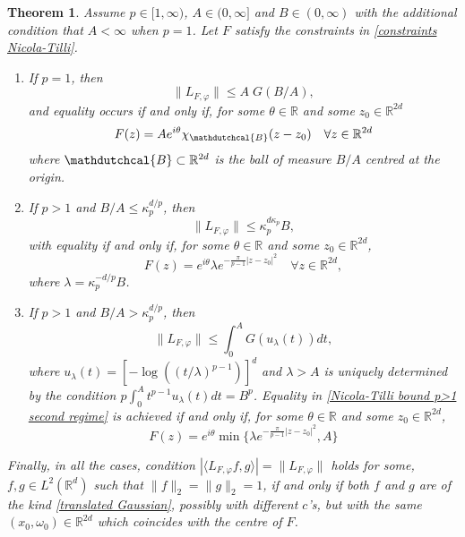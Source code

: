 \documentclass[corpo=11pt, stile=classica, tipotesi=custom,
greek, evenboxes, english]{toptesi}
\numberwithin{equation}{chapter}
\newtheorem{teo}{Theorem}[chapter] %
\theoremstyle{definition}
\theoremstyle{remark}
\newcommand{\R}{\mathbb{R}} %
\begin{document}
\begin{teo}\label{Nicola Tilli norm theorem}
	Assume $p \in [1,\infty)$, $A \in (0, \infty]$ and $B \in (0,\infty)$ with the additional condition that $A < \infty$ when $p=1$. Let $F$ satisfy the constraints in \eqref{constraints Nicola-Tilli}.
	\begin{enumerate}[label=(\roman*)]
		\item If $p=1$, then
		\begin{equation}\label{Nicola-Tilli bound p=1}
			\|L_{F, \varphi}\| \leq A\;G(B/A),
		\end{equation}
		and equality occurs if and only if, for some $\theta \in \R$ and some $z_0 \in \R^{2d}$
		\begin{equation}\label{Nicola-Tilli maximal function p=1}
			F(z) = A e^{i\theta} \chi_{\mathdutchcal{B}} (z-z_0) \quad \forall z \in \R^{2d}
		\end{equation}
		where $\mathdutchcal{B} \subset \R^{2d}$ is the ball of measure $B/A$ centred at the origin.
		
		\item If $p>1$ and $B/A \leq \kappa_p^{d/p}$, then
		\begin{equation}\label{Nicola-Tilli bound p>1 first regime}
			\|L_{F, \varphi}\| \leq \kappa_p^{d \kappa_p}B,
		\end{equation}
		with equality if and only if, for some $\theta \in \R$ and some $z_0 \in \R^{2d}$,
		\begin{equation}\label{Nicola-Tilli maximal function p>1 first regime}
			F(z) = e^{i \theta} \lambda e^{-\frac{\pi}{p-1}|z-z_0|^2} \quad \forall z \in \R^{2d},
		\end{equation}
		where $\lambda = \kappa_p^{-d/p}B$.\label{Nicola-Tilli norm theorem case 2}	
		\item If $p>1$ and $B/A > \kappa_p^{d/p}$, then
		\begin{equation}\label{Nicola-Tilli bound p>1 second regime}
			\|L_{F, \varphi}\| \leq \int_{0}^{A} G(u_{\lambda}(t))dt,
		\end{equation}
		where $u_{\lambda}(t) = \left[-\log\left(\left(t/\lambda\right)^{p-1}\right) \right]^d$ and $\lambda>A$ is uniquely determined by the condition $p\int_{0}^{A} t^{p-1}u_{\lambda}(t)dt = B^p$. Equality in \eqref{Nicola-Tilli bound p>1 second regime} is achieved if and only if, for some $\theta \in \R$ and some $z_0 \in \R^{2d}$,
		\begin{equation}\label{Nicola-Tilli maximal function p>1 second regime}
			F(z) = e^{i\theta} \min \{ \lambda e^{-\frac{\pi}{p-1}|z-z_0|^2}, A \}
		\end{equation}
	\end{enumerate}
	Finally, in all the cases, condition $|\langle L_{F, \varphi} f,g \rangle| = \|L_{F, \varphi}\|$ holds for some, $f,g \in L^2(\R^d)$ such that $\|f\|_2 = \|g\|_2 = 1$, if and only if both $f$ and $g$ are of the kind \eqref{translated Gaussian}, possibly with different $c$'s, but with the same $(x_0,\omega_0) \in \R^{2d}$ which coincides with the centre of $F$.
\end{teo}
\end{document}
